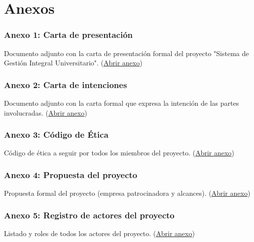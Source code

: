 \chapter{Anexos}

\subsection*{Anexo 1: Carta de presentación}
\label{anexo:carta_presentacion}
\parbox{\linewidth}{%
Documento adjunto con la carta de presentación formal del proyecto "Sistema de Gestión Integral Universitario".
(\href{https://drive.google.com/file/d/1ZiMqNbFV13NKYQdoq0BSWwP7N5zLHqEC/view?usp=sharing}{Abrir anexo})
}

\subsection*{Anexo 2: Carta de intenciones}
\label{anexo:carta_intenciones}
\parbox{\linewidth}{%
Documento adjunto con la carta formal que expresa la intención de las partes involucradas.
(\href{https://docs.google.com/document/d/1mUg4rNGD-5bXCqqc1IveIhCw3kNjwFzT/edit?usp=sharing&ouid=101041738052125290143&rtpof=true&sd=true}{Abrir anexo})
}

\subsection*{Anexo 3: Código de Ética}
\label{anexo:codigo_etica}
\parbox{\linewidth}{%
Código de ética a seguir por todos los miembros del proyecto.
(\href{https://drive.google.com/file/d/1UWY2H4dAQ1W3nxtcGwQE1XzGkuUX-IoS/view?usp=sharing}{Abrir anexo})
}

\subsection*{Anexo 4: Propuesta del proyecto}
\label{anexo:propuesta_proyecto}
\parbox{\linewidth}{%
Propuesta formal del proyecto (empresa patrocinadora y alcances).
(\href{https://docs.google.com/document/d/13UJsHS4BudBLwkDqmcAJCtjnNyk6dAAS/edit?usp=sharing&ouid=101041738052125290143&rtpof=true&sd=true}{Abrir anexo})
}

\subsection*{Anexo 5: Registro de actores del proyecto}
\label{anexo:registro_actores}
\parbox{\linewidth}{%
Listado y roles de todos los actores del proyecto.
(\href{https://drive.google.com/file/d/1S9Q-E96NIDpG0EMDX2YKTTqEs6Od8mdS/view?usp=sharing}{Abrir anexo})
}

